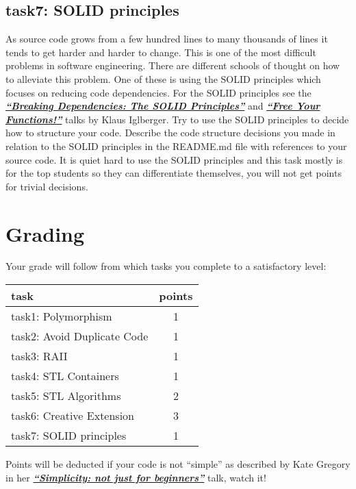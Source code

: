 \documentclass[12pt]{article}
\newcommand*{\link}[2]{\href{#1}{\color{blue}\textbf{\textit{#2}}}}
\begin{document}
\subsection{task7: SOLID principles}
As source code grows from a few hundred lines to many thousands of
lines it tends to get harder and harder to change. This is one of the
most difficult problems in software engineering. There are different
schools of thought on how to alleviate this problem. One of these is
using the SOLID principles which focuses on reducing code
dependencies. For the SOLID principles see the
\link{https://www.youtube.com/watch?v=Ntraj80qN2k} {``Breaking
  Dependencies: The SOLID Principles''} and
\link{https://www.youtube.com/watch?v=WLDT1lDOsb4} {``Free Your
  Functions!''} talks by Klaus Iglberger. Try to use the SOLID
principles to decide how to structure your code. Describe the code
structure decisions you made in relation to the SOLID principles in
the README.md file with references to your source code. It is quiet
hard to use the SOLID principles and this task mostly is for the top
students so they can differentiate themselves, you will not get points
for trivial decisions.

\section{Grading}
Your grade will follow from which tasks you complete to a satisfactory
level:
\begin{center}
\begin{tabular}{ |l|c| } 
  \hline
  \textbf{task}               &  \textbf{points}\\ \hline
  task1: Polymorphism         &               1 \\
  task2: Avoid Duplicate Code &               1 \\
  task3: RAII                 &               1 \\
  task4: STL Containers       &               1 \\
  task5: STL Algorithms       &               2 \\
  task6: Creative Extension   &               3 \\
  task7: SOLID principles     &               1 \\
  \hline
\end{tabular}
\end{center}

Points will be deducted if your code is not ``simple'' as described by
Kate Gregory in her \link{https://www.youtube.com/watch?v=n0Ak6xtVXno}
{``Simplicity: not just for beginners''} talk, watch it!
\end{document}
